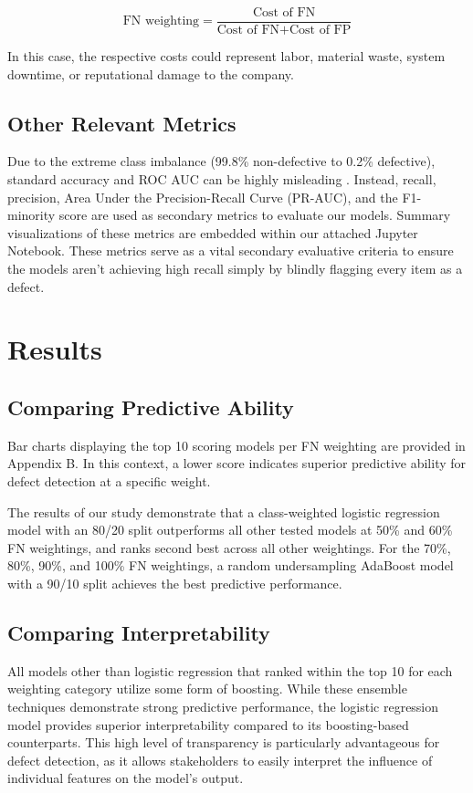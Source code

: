 \documentclass{article}
\begin{document}
\begin{equation}
\text{FN weighting} = \frac{\text{Cost of FN}}{\text{Cost of FN} + \text{Cost of FP}}
\end{equation}

In this case, the respective costs could represent labor, material waste, system downtime, or reputational damage to the company. 

\subsection{Other Relevant Metrics}
Due to the extreme class imbalance (99.8\% non-defective to 0.2\% defective), standard accuracy and ROC AUC can be highly misleading \cite{imani2026roc}. Instead, recall, precision, Area Under the Precision-Recall Curve (PR-AUC), and the F1-minority score are used as secondary metrics to evaluate our models.
Summary visualizations of these metrics are embedded within our attached Jupyter Notebook. These metrics serve as a vital secondary evaluative criteria to ensure the models aren't achieving high recall simply by blindly flagging every item as a defect.

\section{Results}

\subsection{Comparing Predictive Ability}
Bar charts displaying the top 10 scoring models per FN weighting are provided in Appendix B. In this context, a lower score indicates superior predictive ability for defect detection at a specific weight. 

The results of our study demonstrate that a class-weighted logistic regression model with an 80/20 split outperforms all other tested models at 50\% and 60\% FN weightings, and ranks second best across all other weightings. For the 70\%, 80\%, 90\%, and 100\% FN weightings, a random undersampling AdaBoost model with a 90/10 split achieves the best predictive performance.

\subsection{Comparing Interpretability}

All models other than logistic regression that ranked within the top 10 for each weighting category utilize some form of boosting. While these ensemble techniques demonstrate strong predictive performance, the logistic regression model provides superior interpretability compared to its boosting-based counterparts. This high level of transparency is particularly advantageous for defect detection, as it allows stakeholders to easily interpret the influence of individual features on the model's output.
\end{document}
